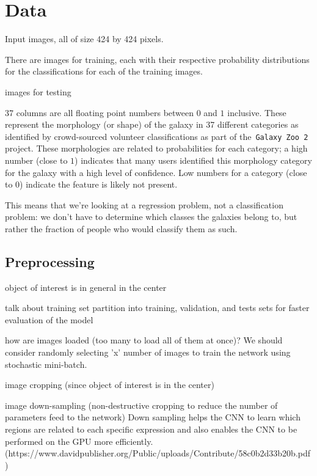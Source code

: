 \section{Data}

Input images, all of size 424 by 424 pixels.

There are  images for training, each with their respective probability distributions for the classifications for each of the training images.

 images for testing

37 columns are all floating point numbers between $0$ and $1$ inclusive. These represent the morphology (or shape) of the galaxy in 37 different categories as identified by crowd-sourced volunteer classifications as part of the~\texttt{Galaxy Zoo 2} project. These morphologies are related to probabilities for each category; a high number (close to $1$) indicates that many users identified this morphology category for the galaxy with a high level of confidence. Low numbers for a category (close to $0$) indicate the feature is likely not present.

This means that we’re looking at a regression problem, not a classification problem: we don’t have to determine which classes the galaxies belong to, but rather the fraction of people who would classify them as such.


\subsection{Preprocessing}

object of interest is in general in the center

talk about training set partition into training, validation, and tests sets for faster evaluation of the model

how are images loaded (too many to load all of them at once)? We should consider randomly selecting 'x' number of images to train the network using stochastic mini-batch.

image cropping (since object of interest is in the center)

image down-sampling (non-destructive cropping to reduce the number of parameters feed to the network)
	Down sampling helps the CNN to learn which regions are related to each specific expression and also enables the CNN to be performed on the GPU more efficiently.(https://www.davidpublisher.org/Public/uploads/Contribute/58c0b2d33b20b.pdf)


